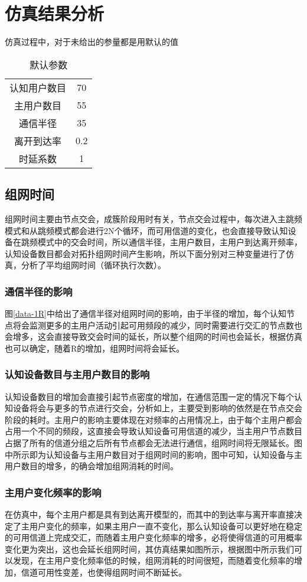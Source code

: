 \documentclass[a4paper,AutoFakeBold,oneside,12pt]{book}
\begin{document}
\chapter{仿真结果分析}
  仿真过程中，对于未给出的参量都是用默认的值
  \begin{table}[h]
  \setlength{\belowcaptionskip}{7pt}
  \centering
  \caption{默认参数}
 
  \begin{tabular}{cc} 
  认知用户数目&70\\
  主用户数目&55\\
  通信半径&35\\
  离开到达率&0.2\\
  时延系数&1
  \end{tabular}
  \end{table}
  \section{组网时间}
   组网时间主要由节点交会，成簇阶段用时有关，节点交会过程中，每次进入主跳频模式和从跳频模式都会进行2N个循环，而可用信道的变化，也会直接导致认知设备在跳频模式中的交会时间，所以通信半径，主用户数目，主用户到达离开频率，认知设备数目都会对拓扑组网时间产生影响，所以下面分别对三种变量进行了仿真，分析了平均组网时间（循环执行次数）。
  \subsection{通信半径的影响}
  图\ref{data-1R}中给出了通信半径对组网时间的影响，由于半径的增加，每个认知节点将会监测更多的主用户活动引起可用频段的减少，同时需要进行交汇的节点数也会增多，这会直接导致交会时间的延长，所以整个组网的时间也会延长，根据仿真也可以确定，随着R的增加，组网时间将会延长。
  \subsection{认知设备数目与主用户数目的影响}
  认知设备数目的增加会直接引起节点密度的增加，在通信范围一定的情况下每个认知设备将会与更多的节点进行交会，分析如上，主要受到影响的依然是在节点交会阶段的耗时。主用户的影响主要体现在对频率的占用情况上，由于每个主用户都会占用一个不同的频段，这直接会导致认知设备可用信道的减少，当主用户节点数目占据了所有的信道分组之后所有节点都会无法进行通信，组网时间将无限延长。图中所示即为认知设备与主用户数目对于组网时间的影响，图中可知，认知设备与主用户数目的增多，的确会增加组网消耗的时间。
  
  \subsection{主用户变化频率的影响}
  在仿真中，每个主用户都是具有到达离开模型的，而其中的到达率与离开率直接决定了主用户变化的频率，如果主用户一直不变化，那么认知设备可以更好地在稳定的可用信道上完成交汇，而随着主用户变化频率的增多，必将使得信道的可用概率变化更为突出，这也会延长组网时间，其仿真结果如图所示，根据图中所示我们可以发现，在主用户变化频率低的时候，组网消耗的时间很短，而随着变化频率的增加，信道可用性变差，也使得组网时间不断延长。
\end{document}
